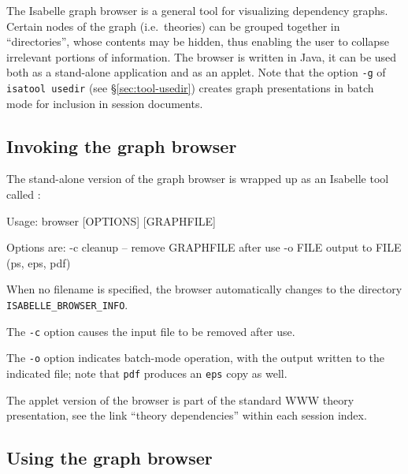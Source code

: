 The Isabelle graph browser is a general tool for visualizing dependency
graphs.  Certain nodes of the graph (i.e.~theories) can be grouped together in
``directories'', whose contents may be hidden, thus enabling the user to
collapse irrelevant portions of information.  The browser is written in Java,
it can be used both as a stand-alone application and as an applet.  Note that
the option \texttt{-g} of \texttt{isatool usedir} (see
\S\ref{sec:tool-usedir}) creates graph presentations in batch mode for
inclusion in session documents.


\subsection{Invoking the graph browser}

The stand-alone version of the graph browser is wrapped up as an
Isabelle tool called :
\begin{ttbox}
Usage: browser [OPTIONS] [GRAPHFILE]

  Options are:
    -c           cleanup -- remove GRAPHFILE after use
    -o FILE      output to FILE (ps, eps, pdf)
\end{ttbox}
When no filename is specified, the browser automatically changes to the
directory \texttt{ISABELLE_BROWSER_INFO}.

\medskip The \texttt{-c} option causes the input file to be removed after use.

The \texttt{-o} option indicates batch-mode operation, with the output written
to the indicated file; note that \texttt{pdf} produces an \texttt{eps} copy as
well.

\medskip The applet version of the browser is part of the standard WWW theory
presentation, see the link ``theory dependencies'' within each session index.


\subsection{Using the graph browser}

